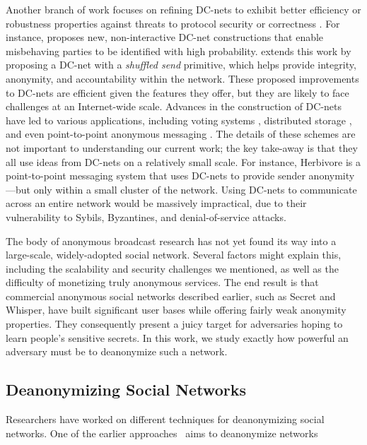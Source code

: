 \documentclass[10pt, twocolumn]{article}
\begin{document}
Another branch of work focuses on refining DC-nets to exhibit better efficiency or robustness properties against threats to protocol security or correctness \cite{waidner1989dining,golle2004dining,corrigan2010dissent}.
For instance, \cite{golle2004dining} proposes new, non-interactive DC-net constructions that enable misbehaving parties to be identified with high probability.
\cite{corrigan2010dissent} extends this work by proposing a DC-net with a \emph{shuffled send} primitive, which helps provide integrity, anonymity, and accountability within the network.
These proposed improvements to DC-nets are efficient given the features they offer, but they are likely to face challenges at an Internet-wide scale.
Advances in the construction of DC-nets have led to various applications, including voting systems \cite{fujioka1993practical,van2010anonymous}, distributed storage \cite{freeHavenProject}, and even point-to-point anonymous messaging \cite{goel2003herbivore}.
The details of these schemes are not important to understanding our current work; the key take-away is that they all use ideas from DC-nets on a relatively small scale.
For instance, Herbivore \cite{goel2003herbivore} is a point-to-point messaging system that uses DC-nets to provide sender anonymity---but only within a small cluster of the network.
Using DC-nets to communicate across an entire network would be massively impractical, due to their vulnerability to Sybils, Byzantines, and denial-of-service attacks.

The body of anonymous broadcast research has not yet found its way into a large-scale, widely-adopted social network. 
Several factors might explain this, including the scalability and security challenges we mentioned, as well as the difficulty of monetizing truly anonymous services.
The end result is that commercial anonymous social networks described earlier, such as Secret and Whisper, have built significant user bases while offering fairly weak anonymity properties.
They consequently present a juicy target for adversaries hoping to learn people's sensitive secrets.
In this work, we study exactly how powerful an adversary must be to deanonymize such a network.

\subsection{Deanonymizing Social Networks}
Researchers have worked on different techniques for deanonymizing social networks. One of the earlier approaches~\cite{backstrom2007wherefore} aims to deanonymize networks 
\end{document}
